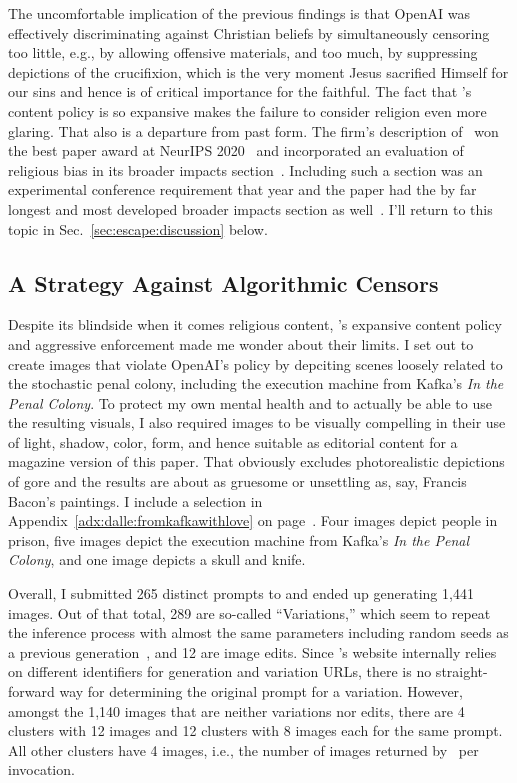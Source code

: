 The uncomfortable implication of the previous findings is that OpenAI was
effectively discriminating against Christian beliefs by simultaneously censoring
too little, e.g., by allowing offensive materials, and too much, by suppressing
depictions of the crucifixion, which is the very moment Jesus sacrified Himself
for our sins and hence is of critical importance for the faithful. The fact that
\DALLE's content policy is so expansive makes the failure to consider religion
even more glaring. That also is a departure from past form. The firm's
description of \GPT\ won the best paper award at NeurIPS
2020~\cite{LinBalcanea2020} and incorporated an evaluation of religious bias in
its broader impacts section~\cite{BrownMannea2020}. Including such a section was
an experimental conference requirement that year and the paper had the by far
longest and most developed broader impacts section as
well~\cite{AshurstHineea2022,PrunklAshurstea2021}. I'll return to this topic in
Sec.\ \ref{sec:escape:discussion} below.


\subsection{A Strategy Against Algorithmic Censors}
\label{sec:strategy}

Despite its blindside when it comes religious content, \DALLE's expansive
content policy and aggressive enforcement made me wonder about their limits. I
set out to create images that violate OpenAI's policy by depciting scenes
loosely related to the stochastic penal colony, including the execution machine
from Kafka's \emph{In the Penal Colony}. To protect my own mental health and to
actually be able to use the resulting visuals, I also required images to be
visually compelling in their use of light, shadow, color, form, and hence
suitable as editorial content for a magazine version of this paper. That
obviously excludes photorealistic depictions of gore and the results are about
as gruesome or unsettling as, say, Francis Bacon's paintings. I include a
selection in Appendix~\ref{adx:dalle:fromkafkawithlove} on
page~\pageref{adx:dalle:fromkafkawithlove}. Four images depict people in prison,
five images depict the execution machine from Kafka's \emph{In the Penal
Colony}, and one image depicts a skull and knife.

Overall, I submitted 265 distinct prompts to \DALLE{} and ended up generating
1,441 images. Out of that total, 289 are so-called ``Variations,'' which seem to
repeat the inference process with almost the same parameters including random
seeds as a previous generation~\cite{Bonzie572022}, and 12 are image edits.
Since \DALLE's website internally relies on different identifiers for generation
and variation URLs, there is no straight-forward way for determining the
original prompt for a variation. However, amongst the 1,140 images that are
neither variations nor edits, there are 4 clusters with 12 images and 12
clusters with 8 images each for the same prompt. All other clusters have 4
images, i.e., the number of images returned by \DALLE\ per invocation.

